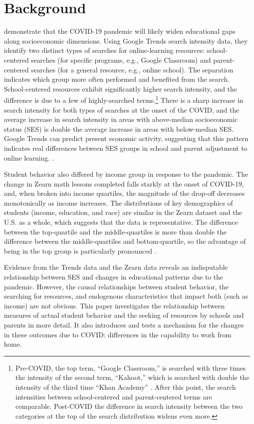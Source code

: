 \section{Background}
\cite{bh1} demonstrate that the COVID-19 pandemic will likely widen educational gaps along socioeconomic dimensions.
Using Google Trends search intensity data, they identify two distinct types of searches for online-learning resources: school-centered searches (for specific programs, e.g., Google Classroom) and parent-centered searches (for a general resource, e.g., online school).
The separation indicates which group more often performed and benefited from the search.
School-centered resources exhibit significantly higher search intensity, and the difference is due to a few of highly-searched terms.\footnote{Pre-COVID, the top term, “Google Classroom,” is searched with three times the intensity of the second term, “Kahoot,” which is searched with double the intensity of the third time “Khan Academy” \cite{bh1}.
After this point, the search intensities between school-centered and parent-centered terms are comparable.
Post-COVID the difference in search intensity between the two categories at the top of the search distribution widens even more.}
There is a sharp increase in search intensity for both types of searches at the onset of the COVID, and the average increase in search intensity in areas with above-median socioeconomic status (SES) is double the average increase in areas with below-median SES.
Google Trends can predict present economic activity, suggesting that this pattern indicates real differences between SES groups in school and parent adjustment to online learning. \citep{choi}.

Student behavior also differed by income group in response to the pandemic.
The change in Zearn math lessons completed falls starkly at the onset of COVID-19, and, when broken into income quartiles, the magnitude of the drop-off decreases monotonically as income increases.
The distributions of key demographics of students (income, education, and race) are similar in the Zearn dataset and the U.S. as a whole, which suggests that the data is representative.
The difference between the top-quartile and the middle-quartiles is more than double the difference between the middle-quartiles and bottom-quartile, so the advantage of being in the top group is particularly pronounced \citep{chetty}.

Evidence from the Trends data and the Zearn data reveals an indisputable relationship between SES and changes in educational patterns due to the pandemic.
However, the causal relationships between student behavior, the searching for resources, and endogenous characteristics that impact both (such as income) are not obvious.
This paper investigates the relationship between measures of actual student behavior and the seeking of resources by schools and parents in more detail.
It also introduces and tests a mechanism for the changes in these outcomes due to COVID: differences in the capability to work from home.


